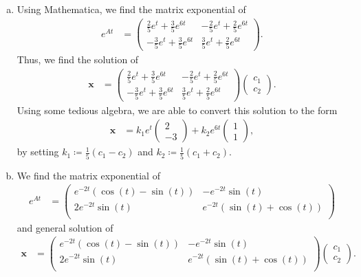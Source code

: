\documentclass[10pt]{mypackage}
\begin{document}
\begin{solution}[8.4, Problem 27]\hfill
  \begin{enumerate}[(a)]
    \item Using Mathematica, we find the matrix exponential of
      \begin{align*}
        e^{At} &= \begin{pmatrix}\frac{2}{5}e^{t} + \frac{3}{5}e^{6t} & -\frac{2}{5}e^{t} + \frac{2}{5}e^{6t} \\ -\frac{3}{5}e^{t} + \frac{3}{5}e^{6t} & \frac{3}{5}e^{t} + \frac{2}{5}e^{6t}\end{pmatrix}.
      \end{align*}
      Thus, we find the solution of
      \begin{align*}
        \mathbf{x} &= \begin{pmatrix}\frac{2}{5}e^{t} + \frac{3}{5}e^{6t} & -\frac{2}{5}e^{t} + \frac{2}{5}e^{6t} \\ -\frac{3}{5}e^{t} + \frac{3}{5}e^{6t} & \frac{3}{5}e^{t} + \frac{2}{5}e^{6t}\end{pmatrix} \begin{pmatrix}c_1\\c_2\end{pmatrix}.
      \end{align*}
      Using some tedious algebra, we are able to convert this solution to the form
      \begin{align*}
        \mathbf{x} &= k_1e^{t} \begin{pmatrix}2\\-3\end{pmatrix} + k_2 e^{6t} \begin{pmatrix}1\\1\end{pmatrix},
      \end{align*}
      by setting $k_1 \coloneq \frac{1}{5}\left( c_1 - c_2 \right)$ and $k_2 \coloneq \frac{1}{5}\left( c_1 + c_2 \right)$.
    \item We find the matrix exponential of
      \begin{align*}
        e^{At} &= 
\begin{pmatrix}
 e^{-2 t} \left(\cos (t)-\sin (t)\right) & -e^{-2 t} \sin (t) \\
 2 e^{-2 t} \sin (t) & e^{-2 t} \left(\sin (t)+\cos (t)\right) \\
\end{pmatrix}
      \end{align*}
      and general solution of
      \begin{align*}
        \mathbf{x} &= 
\begin{pmatrix}
 e^{-2 t} \left(\cos (t)-\sin (t)\right) & -e^{-2 t} \sin (t) \\
 2 e^{-2 t} \sin (t) & e^{-2 t} \left(\sin (t)+\cos (t)\right) \\
\end{pmatrix} \begin{pmatrix}c_1\\c_2\end{pmatrix}.
      \end{align*}
      
  \end{enumerate}
\end{solution}
\end{document}
